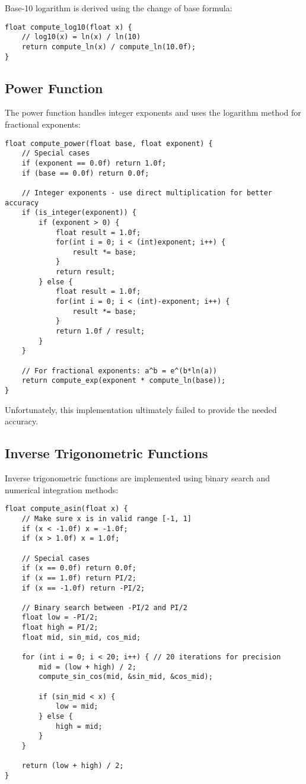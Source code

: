 \documentclass[12pt,a4paper]{article}
\begin{document}
Base-10 logarithm is derived using the change of base formula:

\begin{lstlisting}
float compute_log10(float x) {
    // log10(x) = ln(x) / ln(10)
    return compute_ln(x) / compute_ln(10.0f);
}
\end{lstlisting}

\subsection{Power Function}

The power function handles integer exponents and uses the logarithm method for fractional exponents:

\begin{lstlisting}
float compute_power(float base, float exponent) {
    // Special cases
    if (exponent == 0.0f) return 1.0f;
    if (base == 0.0f) return 0.0f;
    
    // Integer exponents - use direct multiplication for better accuracy
    if (is_integer(exponent)) {
        if (exponent > 0) {
            float result = 1.0f;
            for(int i = 0; i < (int)exponent; i++) {
                result *= base;
            }
            return result;
        } else {
            float result = 1.0f;
            for(int i = 0; i < (int)-exponent; i++) {
                result *= base;
            }
            return 1.0f / result;
        }
    }
    
    // For fractional exponents: a^b = e^(b*ln(a))
    return compute_exp(exponent * compute_ln(base));
}
\end{lstlisting}
Unfortunately, this implementation ultimately failed to provide the needed accuracy.
\subsection{Inverse Trigonometric Functions}

Inverse trigonometric functions are implemented using binary search and numerical integration methods:

\begin{lstlisting}
float compute_asin(float x) {
    // Make sure x is in valid range [-1, 1]
    if (x < -1.0f) x = -1.0f;
    if (x > 1.0f) x = 1.0f;
    
    // Special cases
    if (x == 0.0f) return 0.0f;
    if (x == 1.0f) return PI/2;
    if (x == -1.0f) return -PI/2;
    
    // Binary search between -PI/2 and PI/2
    float low = -PI/2;
    float high = PI/2;
    float mid, sin_mid, cos_mid;
    
    for (int i = 0; i < 20; i++) { // 20 iterations for precision
        mid = (low + high) / 2;
        compute_sin_cos(mid, &sin_mid, &cos_mid);
        
        if (sin_mid < x) {
            low = mid;
        } else {
            high = mid;
        }
    }
    
    return (low + high) / 2;
}
\end{lstlisting}
\end{document}
